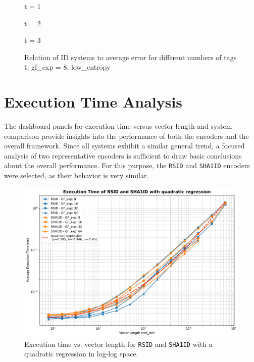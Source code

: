 \documentclass[english,BCOR=4mm,cdfont=false]{tudscrreprt} %
\begin{document}
\begin{figure}[htbp]
  \centering
  \begin{minipage}[t]{0.32\textwidth}
    \centering
    
    \caption{t = 1}
  \end{minipage}
  \hfill
  \begin{minipage}[t]{0.32\textwidth}
    \centering
    
    \caption{t = 2}

  \end{minipage}
  \hfill
  \begin{minipage}[t]{0.32\textwidth}
    \centering
    
    \caption{t = 3}

  \end{minipage}
  \caption{Relation of ID systems to average error for different numbers of tags t, gf\_exp = 8, low\_entropy}
  \label{fig:tagCompare}
\end{figure}



\section{Execution Time Analysis}
\label{sec:exectime}
The dashboard panels for execution time versus vector length and system comparison provide insights into the performance of both the encoders and the overall framework. Since all systems exhibit a similar general trend, a focused analysis of two representative encoders is sufficient to draw basic conclusions about the overall performance. For this purpose, the \texttt{RSID} and \texttt{SHA1ID} encoders were selected, as their behavior is very similar.

\begin{figure}[h!]
    \centering
    \includegraphics[width=0.75\linewidth]{plots/execution_time_quadratic_regression.png}
    \caption{Execution time vs. vector length for \texttt{RSID} and \texttt{SHA1ID} with a quadratic regression in log-log space.}
    \label{fig:quadRegExec}
\end{figure}
\end{document}
